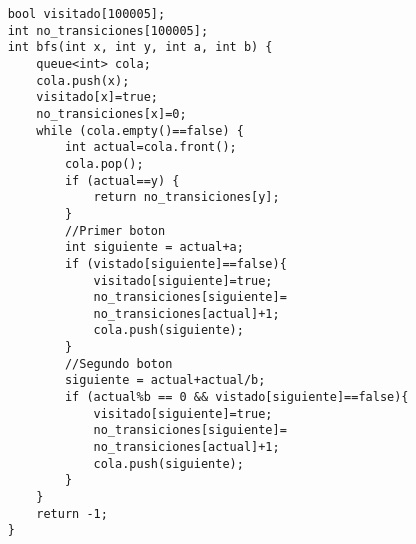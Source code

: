 \begin{minipage}{\linewidth}
\begin{lstlisting}
	bool visitado[100005];
	int no_transiciones[100005];
	int bfs(int x, int y, int a, int b) {
		queue<int> cola;
		cola.push(x);
		visitado[x]=true;
		no_transiciones[x]=0;		
		while (cola.empty()==false) {
			int actual=cola.front();
			cola.pop();
			if (actual==y) {
				return no_transiciones[y];
			}	
			//Primer boton
			int siguiente = actual+a;
			if (vistado[siguiente]==false){
				visitado[siguiente]=true;
				no_transiciones[siguiente]=
				no_transiciones[actual]+1;
				cola.push(siguiente);
			}
			//Segundo boton
			siguiente = actual+actual/b;
			if (actual%b == 0 && vistado[siguiente]==false){
				visitado[siguiente]=true;
				no_transiciones[siguiente]=
				no_transiciones[actual]+1;
				cola.push(siguiente);
			}
		}
		return -1;
	}
\end{lstlisting}
\end{minipage}